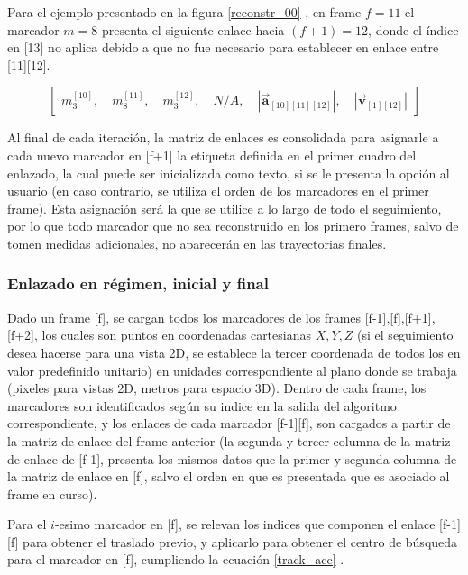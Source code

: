 Para el ejemplo presentado en la figura \ref{reconstr_00} , en frame $f=11$ el marcador $m=8$ presenta el siguiente enlace hacia $(f+1)=12$, donde el índice en [13] no aplica debido a que no fue necesario para establecer en enlace entre [11][12].

\begin{equation}
\begin{bmatrix}
  m_{3}^{[10]} ,\quad m_{8}^{[11]} ,\quad m_{3}^{[12]} ,\quad N/A ,\quad \left|\boldsymbol{\overrightarrow{a}}_{[10][11][12]}\right| ,\quad \left|\boldsymbol{\overrightarrow{v}}_{[1][12]}\right|
\end{bmatrix}
\end{equation}

Al final de cada iteración, la matriz de enlaces es consolidada para asignarle a cada nuevo marcador en [f+1] la etiqueta definida en el primer cuadro del enlazado, la cual puede ser inicializada como texto, si se le presenta la opción al usuario (en caso contrario, se utiliza el orden de los marcadores en el primer frame). Esta asignación será la que se utilice a lo largo de todo el seguimiento, por lo que todo marcador que no sea reconstruido en los primero frames, salvo de tomen medidas adicionales, no aparecerán en las trayectorias finales.

\subsubsection{Enlazado en régimen, inicial y final}

Dado un frame [f], se cargan todos los marcadores de los frames [f-1],[f],[f+1],[f+2], los cuales son puntos en coordenadas cartesianas $X,Y,Z$ (si el seguimiento desea hacerse para una vista 2D, se establece la tercer coordenada de todos los en valor predefinido unitario) en unidades correspondiente al plano donde se trabaja (pixeles para vistas 2D, metros para espacio 3D). Dentro de cada frame, los marcadores son identificados según su indice en la salida del algoritmo correspondiente, y los enlaces de cada marcador [f-1][f], son cargados a partir de la matriz de enlace del frame anterior (la segunda y tercer columna de la matriz de enlace de [f-1], presenta los mismos datos que la primer y segunda columna de la matriz de enlace en [f], salvo el orden en que es presentada que es asociado al frame en curso).

Para el $i$-esimo marcador en [f], se relevan los indices que componen el enlace [f-1][f] para obtener el traslado previo, y aplicarlo para obtener el centro de búsqueda para el marcador en [f], cumpliendo la ecuación \ref{track_acc} .

